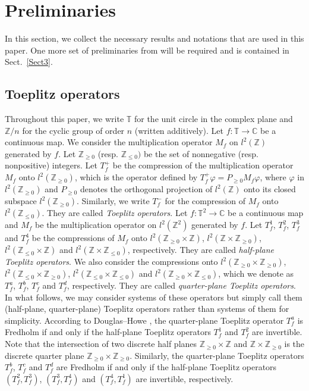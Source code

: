\documentclass{amsart}
\theoremstyle{plain}
\theoremstyle{definition}
\theoremstyle{remark}
\newcommand{\Z}{\mathbb{Z}}
\newcommand{\C}{\mathbb{C}}
\newcommand{\T}{\mathbb{T}}
\begin{document}
\section{Preliminaries}
\label{Sect2}
In this section, we collect the necessary results and notations that are used in this paper.
One more set of preliminaries from \cite{Gomi15} will be required and is contained in Sect.~\ref{Sect3}.

\subsection{Toeplitz operators}
\label{Sect2.1}
Throughout this paper, we write $\T$ for the unit circle in the complex plane and
$\Z/n$ for the cyclic group of order $n$ (written additively).
Let $f \colon \T \to \C$ be a continuous map.
We consider the multiplication operator $M_f$ on $l^2(\Z)$ generated by $f$.
Let $\Z_{\geq 0}$ (resp. $\Z_{\leq 0})$ be the set of nonnegative (resp. nonpositive) integers.
Let $T^+_f $ be the compression of the multiplication operator $M_f$ onto $l^2(\Z_{\geq 0})$, which is the operator defined by $T^+_f \varphi = P_{\geq 0} M_f \varphi$, where $\varphi$ in $l^2(\Z_{\geq 0})$ and $P_{\geq 0}$ denotes the orthogonal projection of $l^2(\Z)$ onto its closed subspace $l^2(\Z_{\geq 0})$.
Similarly, we write $T^-_f$ for the compression of $M_f$ onto $l^2(\Z_{\leq 0})$.
They are called {\em Toeplitz operators}.
Let $f \colon \T^2 \to \C$ be a continuous map and $M_f$ be the multiplication operator on $l^2(\Z^2)$ generated by $f$.
Let $T^1_f$, $T^2_f$, $T^3_f$ and $T^4_f$ be the compressions of $M_f$ onto $l^2(\Z_{\geq 0} \times \Z)$, $l^2(\Z \times \Z_{\geq 0})$, $l^2(\Z_{\leq 0} \times \Z)$ and $l^2(\Z \times \Z_{\leq 0})$, respectively.
They are called {\em half-plane Toeplitz operators}.
We also consider the compressions onto $l^2(\Z_{\geq 0} \times \Z_{\geq 0})$, $l^2(\Z_{\leq 0} \times \Z_{\geq 0})$, $l^2(\Z_{\leq 0} \times \Z_{\leq 0})$ and $l^2(\Z_{\geq 0} \times \Z_{\leq 0})$, which we denote as $T^a_f$, $T^b_f$, $T^c_f$ and $T^d_f$, respectively. They are called {\em quarter-plane Toeplitz operators}.
In what follows, we may consider systems of these operators but simply call them (half-plane, quarter-plane) Toeplitz operators rather than systems of them for simplicity.
According to Douglas--Howe \cite{DH71}, the quarter-plane Toeplitz operator $T_f^a$ is Fredholm if and only if the half-plane Toeplitz operators $T^1_f$ and $T^2_f$ are invertible.
Note that the intersection of two discrete half planes $\Z_{\geq 0} \times \Z$ and $\Z \times \Z_{\geq 0}$ is the discrete quarter plane $\Z_{\geq 0} \times \Z_{\geq 0}$.
Similarly, the quarter-plane Toeplitz operators $T^b_f$, $T^c_f$ and $T^d_f$ are Fredholm if and only if the half-plane Toeplitz operators $(T^2_f, T^3_f)$, $(T^3_f, T^4_f)$ and $(T^4_f, T^1_f)$ are invertible, respectively.
\end{document}
